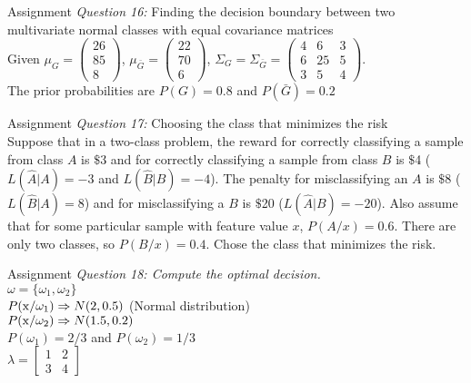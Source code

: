 \begin{frame}{Assignment}
\textit{\color{slidecolor}Question 16:} {\color{slidecolor}Finding the decision boundary between two multivariate normal classes with equal covariance matrices}\\
Given ${\mu _G} = \left( {\begin{array}{*{20}{c}}
{26}\\
{85}\\
8
\end{array}} \right)$, ${\mu _{\bar{G}}} = \left( {\begin{array}{*{20}{c}}
{22}\\
{70}\\
6
\end{array}} \right)$, ${\Sigma _G} ={\Sigma _{\bar{G}}}= \left( {\begin{array}{*{20}{c}}
4&6&3\\
6&{25}&5\\
3&5&4
\end{array}} \right)$. \\The prior probabilities are $P(G)=0.8$ and $P(\bar{G})=0.2$
\end{frame}

\begin{frame}{Assignment}
\textit{\color{slidecolor}Question 17:} {\color{slidecolor}Choosing the class that minimizes the risk}\\
Suppose that in a two-class problem, the reward for correctly classifying a sample from class $A$ is $\$$3 and for correctly classifying a sample from class $B$ is $\$$4 ($L(\hat{A}|A)=-3$ and $L(\hat{B}|B)=-4$). The penalty for misclassifying an $A$ is $\$$8 ($L(\hat{B}|A)=8$) and for misclassifying a $B$ is $\$$20 ($L(\hat{A}|B)=-20$). Also assume that for some particular sample with feature value $x$, $P(A/x)=0.6$. There are only two classes, so $P(B/x)=0.4$. Chose the class that minimizes the risk.
\end{frame}

\begin{frame}{Assignment}
\textit{\color{slidecolor}Question 18: Compute the optimal decision.}\\
$\omega=\{\omega_1,\omega_2\}$\\
$P({\rm x}/\omega_1)\Rightarrow N(2,0.5)$ (Normal distribution)\\
$P({\rm x}/\omega_2)\Rightarrow N(1.5,0.2)$\\
$P(\omega_1)=2/3$ and $P(\omega_2)=1/3$ \\
$\lambda = \left[ {\begin{array}{*{20}{c}}
1&2\\
3&4
\end{array}} \right]$
\end{frame}

